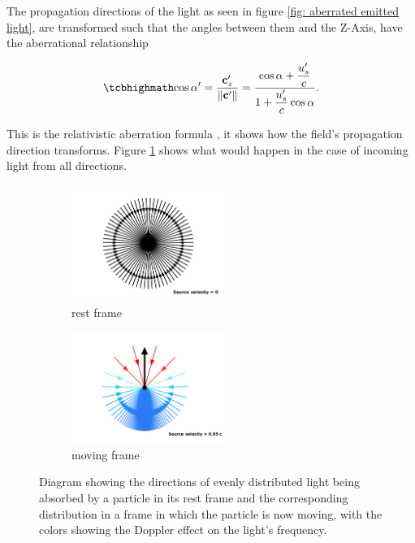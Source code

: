 The propagation directions of the light as seen in figure \ref{fig: aberrated emitted light}, are transformed such that the angles between them and the Z-Axis, have the aberrational relationship

\begin{equation}
	\label{eq: Cosine transform}
	\mhl{
		\cos\alpha' = \frac{\mathbf{c}'_z}{\|\mathbf{c}'\|} = \dfrac{\cos\alpha + \dfrac{u'_s}{c}}{1+\dfrac{u'_s}{c}\cos\alpha}.
	}
\end{equation}

This is the relativistic aberration formula \cite{einstein1905electrodynamics}, it shows how the field's propagation direction transforms. Figure \ref{fig: aberrated absorbed light} shows what would happen in the case of incoming light from all directions.

\begin{figure}[ht]
	\begin{subfigure}{.49\textwidth}
		\centering
		\includegraphics[width=5cm]{images/pdf/Aberrated_velocities_inwards_restframe.pdf}
		\caption{rest frame}
	\end{subfigure}
	\begin{subfigure}{.49\textwidth}
		\centering
		\includegraphics[width=5cm]{images/pdf/Aberrated_velocities_inwards.pdf}
		\caption{moving frame}
	\end{subfigure}
	\caption{Diagram showing the directions of evenly distributed light being absorbed by a particle in its rest frame and the corresponding distribution in a frame in which the particle is now moving, with the colors showing the Doppler effect on the light's frequency.}
	\label{fig: aberrated absorbed light}
\end{figure}


